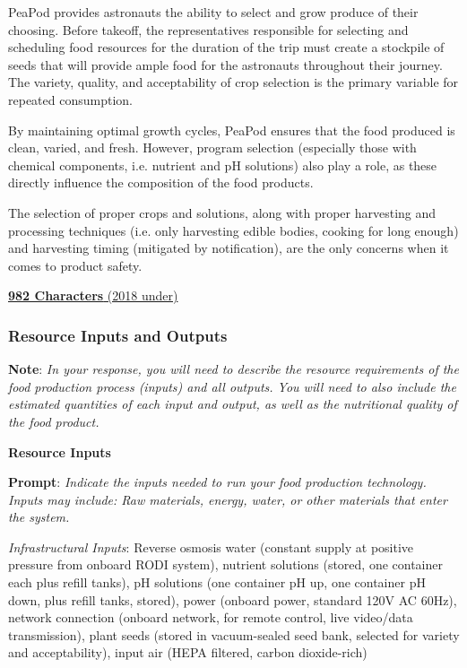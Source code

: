 \documentclass{report}
\begin{document}
PeaPod provides astronauts the ability to select and grow produce of their choosing. Before takeoff, the representatives responsible for selecting and scheduling food resources for the duration of the trip must create a stockpile of seeds that will provide ample food for the astronauts throughout their journey. The variety, quality, and acceptability of crop selection is the primary variable for repeated consumption.

By maintaining optimal growth cycles, PeaPod ensures that the food produced is clean, varied, and fresh. However, program selection (especially those with chemical components, i.e. nutrient and pH solutions) also play a role, as these directly influence the composition of the food products.

The selection of proper crops and solutions, along with proper harvesting and processing techniques (i.e. only harvesting edible bodies, cooking for long enough) and harvesting timing (mitigated by notification), are the only concerns when it comes to product safety.

\uline{\textbf{982 Characters} (2018 under)}


\newpage

\subsubsection{Resource Inputs and Outputs}
\label{sec:resource}

\textbf{Note}: \textit{In your response, you will need to describe the resource requirements of the food production process (inputs) and all outputs. You will need to also include the estimated quantities of each input and output, as well as the nutritional quality of the food product.}

\textbf{Resource Inputs}
\label{sec:resource-inputs}

\textbf{Prompt}: \textit{Indicate the inputs needed to run your food production technology. Inputs may include: Raw materials, energy, water, or other materials that enter the system.}


\textit{Infrastructural Inputs}: Reverse osmosis water (constant supply at positive pressure from onboard RODI system), nutrient solutions (stored, one container each plus refill tanks), pH solutions (one container pH up, one container pH down, plus refill tanks, stored), power (onboard power, standard 120V AC 60Hz), network connection (onboard network, for remote control, live video/data transmission), plant seeds (stored in vacuum-sealed seed bank, selected for variety and acceptability), input air (HEPA filtered, carbon dioxide-rich)
\end{document}
